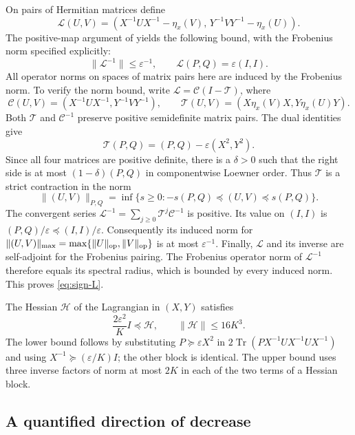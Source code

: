 On pairs of Hermitian matrices define
\[
 \mathcal L(U,V)=
 (X^{-1}UX^{-1}-\eta_x(V),\,
  Y^{-1}VY^{-1}-\eta_x(U)).
\]
The positive-map argument of
\cite[Claim~4.1]{EzeunalaJiang2026} yields the following bound, with
the Frobenius norm specified explicitly:
\begin{equation}
 \|\mathcal L^{-1}\|\le\varepsilon^{-1},\qquad
 \mathcal L(P,Q)=\varepsilon(I,I).
 \label{eq:sign-L}
\end{equation}
All operator norms on spaces of matrix pairs here are induced by the
Frobenius norm. To verify the norm bound, write
$\mathcal L=\mathcal C(I-\mathcal T)$, where
\[
 \mathcal C(U,V)=(X^{-1}UX^{-1},Y^{-1}VY^{-1}),\qquad
 \mathcal T(U,V)=(X\eta_x(V)X,Y\eta_x(U)Y).
\]
Both $\mathcal T$ and $\mathcal C^{-1}$ preserve positive semidefinite
matrix pairs. The dual identities give
\[
 \mathcal T(P,Q)=(P,Q)-\varepsilon(X^2,Y^2).
\]
Since all four matrices are positive definite, there is a
$\delta>0$ such that the right side is at most $(1-\delta)(P,Q)$
in componentwise Loewner order. Thus $\mathcal T$ is a strict
contraction in the norm
\[
 \|(U,V)\|_{P,Q}
 =\inf\{s\ge0:-s(P,Q)\preceq(U,V)\preceq s(P,Q)\}.
\]
The convergent series
$\mathcal L^{-1}=\sum_{j\ge0}\mathcal T^j\mathcal C^{-1}$ is positive.
Its value on $(I,I)$ is $(P,Q)/\varepsilon\preceq(I,I)/\varepsilon$.
Consequently its induced norm for
$\|(U,V)\|_{\max}=\max\{\|U\|_{\mathrm{op}},\|V\|_{\mathrm{op}}\}$ is at most
$\varepsilon^{-1}$. Finally, $\mathcal L$ and its inverse are
self-adjoint for the Frobenius pairing. The Frobenius operator norm
of $\mathcal L^{-1}$ therefore equals its spectral radius, which is
bounded by every induced norm. This proves \eqref{eq:sign-L}.

The Hessian $\mathcal H$ of the Lagrangian in $(X,Y)$
satisfies
\begin{equation}
 \frac{2\varepsilon^2}{K}I\preceq\mathcal H,
 \qquad \|\mathcal H\|\le16K^3.
 \label{eq:sign-H}
\end{equation}
The lower bound follows by substituting $P\succeq\varepsilon X^2$ in
$2\operatorname{Tr}(PX^{-1}UX^{-1}UX^{-1})$ and using
$X^{-1}\succeq(\varepsilon/K)I$; the other block is identical.
The upper bound uses three inverse factors of norm at most $2K$ in
each of the two terms of a Hessian block.

\subsection{A quantified direction of decrease}

